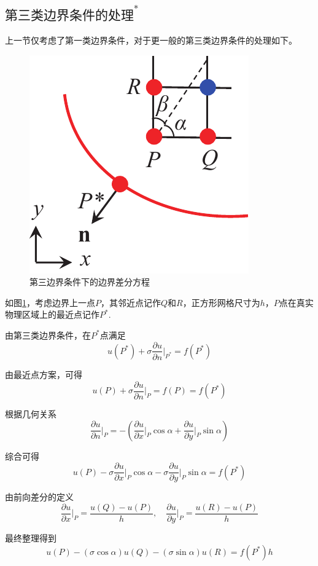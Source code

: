 \subsection{$\mbox{第三类边界条件的处理}^*$}
上一节仅考虑了第一类边界条件，对于更一般的第三类边界条件的处理如下。
\begin{figure}[!htb]
	\centering
	\includegraphics[width=0.2\linewidth]{pic/离散第三边界.pdf}
	\caption{第三边界条件下的边界差分方程}
	\label{第三边界差分}
\end{figure}

如图\ref{第三边界差分}，考虑边界上一点$P$，其邻近点记作$Q$和$R$，正方形网格尺寸为$h$，$P$点在真实物理区域上的最近点记作$P^*$.

\noindent 由第三类边界条件，在$P^*$点满足
\begin{equation}
	u(P^*) + \sigma \dfrac{\partial u}{\partial n}\Bigg|_{P^*} = f(P^*)
\end{equation}

\noindent 由最近点方案，可得
\begin{equation}
	u(P) + \sigma \dfrac{\partial u}{\partial n}\Bigg|_{P} = f(P) = f(P^*)
\end{equation}

\noindent 根据几何关系
\begin{equation}
	\dfrac{\partial u}{\partial n}\Bigg|_{P} = - \left(\dfrac{\partial u}{\partial x}\Bigg|_{P} \cos \alpha + \dfrac{\partial u}{\partial y}\Bigg|_{P} \sin \alpha\right)
\end{equation}

\noindent 综合可得
\begin{equation}
	u(P) - \sigma \dfrac{\partial u}{\partial x}\Bigg|_{P}\cos \alpha - \sigma \dfrac{\partial u}{\partial y}\Bigg|_{P} \sin \alpha = f(P^*)
\end{equation}

\noindent 由前向差分的定义
\begin{equation}
	\dfrac{\partial u}{\partial x}\Bigg|_{P} = \dfrac{u(Q) - u(P)}{h}, \quad \dfrac{\partial u}{\partial y}\Bigg|_{P} = \dfrac{u(R) - u(P)}{h}
\end{equation}

\noindent 最终整理得到
\begin{equation}
	[h+\sigma \cos \alpha + \sigma \sin \alpha ]u(P) - (\sigma \cos \alpha)u(Q)-(\sigma \sin \alpha)u(R) = f(P^*)h
	\label{离散第三边界}
\end{equation}

